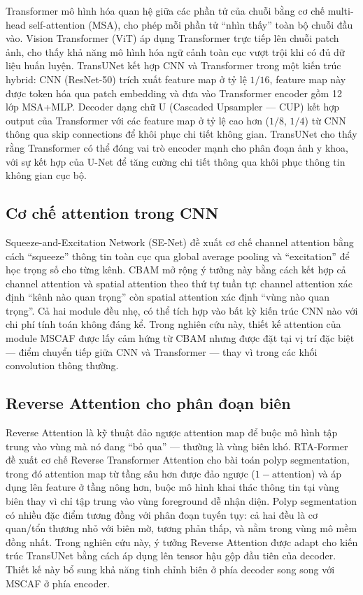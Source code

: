 \documentclass[10pt,a4paper]{article}
\begin{document}
Transformer \cite{vaswani2017attention} mô hình hóa quan hệ giữa các phần tử của chuỗi bằng cơ chế multi-head self-attention (MSA), cho phép mỗi phần tử ``nhìn thấy'' toàn bộ chuỗi đầu vào. Vision Transformer (ViT) \cite{dosovitskiy2021vit} áp dụng Transformer trực tiếp lên chuỗi patch ảnh, cho thấy khả năng mô hình hóa ngữ cảnh toàn cục vượt trội khi có đủ dữ liệu huấn luyện. TransUNet \cite{chen2021transunet} kết hợp CNN và Transformer trong một kiến trúc hybrid: CNN (ResNet-50) trích xuất feature map ở tỷ lệ $1/16$, feature map này được token hóa qua patch embedding và đưa vào Transformer encoder gồm 12 lớp MSA+MLP. Decoder dạng chữ U (Cascaded Upsampler --- CUP) kết hợp output của Transformer với các feature map ở tỷ lệ cao hơn ($1/8$, $1/4$) từ CNN thông qua skip connections để khôi phục chi tiết không gian. TransUNet cho thấy rằng Transformer có thể đóng vai trò encoder mạnh cho phân đoạn ảnh y khoa, với sự kết hợp của U-Net để tăng cường chi tiết thông qua khôi phục thông tin không gian cục bộ.

\subsection{Cơ chế attention trong CNN}

Squeeze-and-Excitation Network (SE-Net) \cite{hu2018senet} đề xuất cơ chế channel attention bằng cách ``squeeze'' thông tin toàn cục qua global average pooling và ``excitation'' để học trọng số cho từng kênh. CBAM \cite{woo2018cbam} mở rộng ý tưởng này bằng cách kết hợp cả channel attention và spatial attention theo thứ tự tuần tự: channel attention xác định ``kênh nào quan trọng'' còn spatial attention xác định ``vùng nào quan trọng''. Cả hai module đều nhẹ, có thể tích hợp vào bất kỳ kiến trúc CNN nào với chi phí tính toán không đáng kể. Trong nghiên cứu này, thiết kế attention của module MSCAF được lấy cảm hứng từ CBAM nhưng được đặt tại vị trí đặc biệt --- điểm chuyển tiếp giữa CNN và Transformer --- thay vì trong các khối convolution thông thường.

\subsection{Reverse Attention cho phân đoạn biên}

Reverse Attention là kỹ thuật đảo ngược attention map để buộc mô hình tập trung vào vùng mà nó đang ``bỏ qua'' --- thường là vùng biên khó. RTA-Former \cite{li2024rtaformer} đề xuất cơ chế Reverse Transformer Attention cho bài toán polyp segmentation, trong đó attention map từ tầng sâu hơn được đảo ngược ($1 - \text{attention}$) và áp dụng lên feature ở tầng nông hơn, buộc mô hình khai thác thông tin tại vùng biên thay vì chỉ tập trung vào vùng foreground dễ nhận diện. Polyp segmentation có nhiều đặc điểm tương đồng với phân đoạn tuyến tụy: cả hai đều là cơ quan/tổn thương nhỏ với biên mờ, tương phản thấp, và nằm trong vùng mô mềm đồng nhất. Trong nghiên cứu này, ý tưởng Reverse Attention được adapt cho kiến trúc TransUNet bằng cách áp dụng lên tensor hậu gộp đầu tiên của decoder. Thiết kế này bổ sung khả năng tinh chỉnh biên ở phía decoder song song với MSCAF ở phía encoder.
\end{document}
